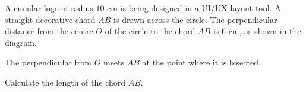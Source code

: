 \documentclass[11pt]{article}
\begin{document}
\begin{question}
\noindent A circular logo of radius $10$ cm is being designed in a UI/UX layout tool. A straight decorative chord $AB$ is drawn across the circle. The perpendicular distance from the centre $O$ of the circle to the chord $AB$ is $6$ cm, as shown in the diagram.

\begin{center}
\end{center}

\noindent The perpendicular from $O$ meets $AB$ at the point where it is bisected.

\noindent Calculate the length of the chord $AB$.
\vspace{4cm}
\begin{flushright}
\end{flushright}
\end{question}
\end{document}
